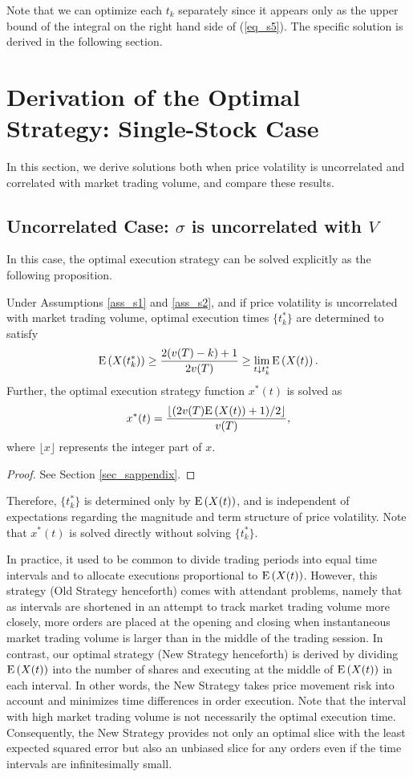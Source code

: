 Note that we can optimize each $t_k$ separately since it appears only as the upper bound of the integral on the right hand side of (\ref{eq_s5}).  The specific solution is derived in the following section.

\section{Derivation of the Optimal Strategy: Single-Stock Case}\label{sec_s3}
In this section, we derive solutions both when price volatility is uncorrelated and correlated with market trading volume, and compare these results.

\subsection{Uncorrelated Case: $\sigma$ is uncorrelated with $V$}
In this case, the optimal execution strategy can be solved explicitly as the following proposition.

\begin{proposition}\label{prop_s3}
 \quad Under Assumptions \ref{ass_s1} and \ref{ass_s2}, and if price volatility is uncorrelated with market trading volume, optimal execution times $\{t_k^*\}$ are determined to satisfy 
\[
  {\mathrm{E}}\left( X(t_k^*) \right) \geq \frac{2(v(T)-k)+1}{2v(T)} \geq \lim_{t \downarrow t_k^*} {\mathrm{E}}\left( X(t) \right).
\]
Further, the optimal execution strategy function $x^*(t)$ is solved as
\[
  x^*(t)=\frac{\lfloor (2v(T){\mathrm{E}}\left( X(t) \right)+1)/2 \rfloor}{v(T)},
\]
where $\lfloor x \rfloor$ represents the integer part of $x$.
\end{proposition}

\begin{proof}
  See Section \ref{sec_sappendix}.
\end{proof}

Therefore, $\{t_k^*\}$ is determined only by ${\mathrm{E}}\left( X(t) \right)$, and is independent of expectations regarding the magnitude and term structure of price volatility.  Note that $x^*(t)$ is solved directly without solving $\{t_k^*\}$.

In practice, it used to be common to divide trading periods into equal time intervals and to allocate executions proportional to ${\mathrm{E}}\left( X(t) \right)$.  However, this strategy (Old Strategy henceforth) comes with attendant problems, namely that as intervals are shortened in an attempt to track market trading volume more closely, more orders are placed at the opening and closing when instantaneous market trading volume is larger than in the middle of the trading session.  In contrast, our optimal strategy (New Strategy henceforth) is derived by dividing ${\mathrm{E}}\left( X(t) \right)$ into the number of shares and executing at the middle of ${\mathrm{E}}\left( X(t) \right)$ in each interval.  In other words, the New Strategy takes price movement risk into account and minimizes time differences in order execution.  Note that the interval with high market trading volume is not necessarily the optimal execution time.  Consequently, the New Strategy provides not only an optimal slice with the least expected squared error but also an unbiased slice for any orders even if the time intervals are infinitesimally small.

